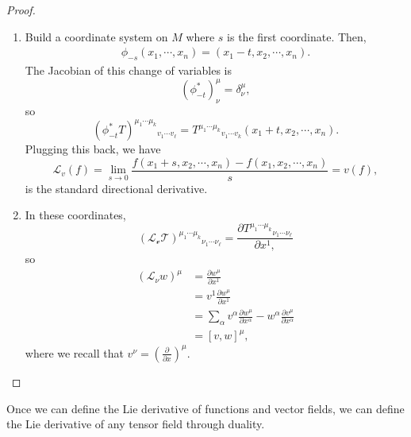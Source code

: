 \documentclass{article}
\numberwithin{equation}{section}
\begin{document}
\begin{proof}
    \begin{enumerate}
        \item Build a coordinate system on $M$ where $s$ is the first coordinate. Then,
        \begin{align*}
            \phi_{-s}(x_1,\cdots,x_n) = (x_1-t,x_2,\cdots,x_n).
        \end{align*}
        The Jacobian of this change of variables is 
        \begin{equation*}
            (\phi^*_{-t})^{\mu}_{\nu} = \delta^{\mu}_{\nu},
        \end{equation*}
        so 
        \begin{equation*}
            (\phi^*_{-t}T)^{\mu_1\cdots \mu_k}{}_{v_1\cdots v_\ell} = T^{\mu_1\cdots \mu_k}{}_{v_1\cdots v_k}(x_1+t,x_2,\cdots,x_n).
        \end{equation*}
        Plugging this back, we have 
        \begin{equation*}
            \mathcal{L}_v(f) = \lim_{s\to 0} \frac{f(x_1+s,x_2,\cdots,x_n) - f(x_1,x_2,\cdots,x_n)}{s} = v(f),
        \end{equation*}
        is the standard directional derivative.
        \item In these coordinates,
        \begin{equation*}
            (\mathcal{{L}_v T})^{\mu_1\cdots\mu_k}{}_{\nu_1\cdots\nu_{\ell}} = \frac{\partial T^{\mu_1\cdots\mu_k}{}_{\nu_1\cdots \nu_\ell}}{\partial x^1,}
        \end{equation*}
        so 
        \begin{align*}
            (\mathcal{L}_{\nu}w)^{\mu} &= \frac{\partial w^{\mu}}{\partial x^1} \\ 
            &= v^1 \frac{\partial w^{\mu}}{\partial x^1} \\ 
            &= \sum_\alpha v^\alpha \frac{\partial w^\mu}{\partial x^\alpha} - w^\alpha \frac{\partial v^\mu}{\partial x^\alpha} \\ 
            &= [v,w]^\mu,
        \end{align*}
        where we recall that $v^\nu = \left(\frac{\partial}{\partial x}\right)^{\mu}$.
    \end{enumerate}
\end{proof}
Once we can define the Lie derivative of functions and vector fields, we can define the Lie derivative of any tensor field through duality.
\end{document}
